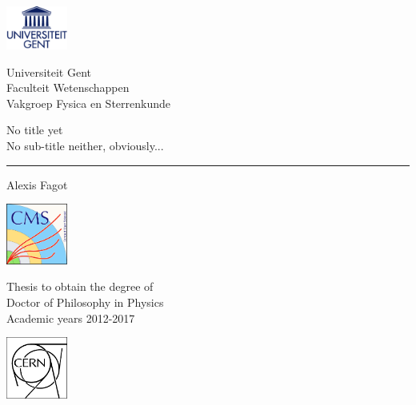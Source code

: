 \documentclass[10pt,a4paper,twoside,dutch,english]{book}                %
\begin{document}
\latintext
\graphicspath{{fig/}}

% 
 \thispagestyle{empty}   %
% 
 \noindent
 \begin{minipage}{3cm}%
   \includegraphics*[width=2cm]{UGentlogo}%
 \end{minipage}\hfill
 \begin{minipage}{8cm}
 \raggedleft
 \textsf{Universiteit Gent\\
 Faculteit Wetenschappen\\
 Vakgroep Fysica en Sterrenkunde}
 \end{minipage}
% 
\bigskip
   \begin{flushleft}
     \Large \textsf{No title yet}\\
     \vspace{0.1in}\large{\textsf{No sub-title neither, obviously...}}%
   \end{flushleft}
 \hrule
% 
 \bigskip
   \LARGE\noindent \textsf{Alexis Fagot} \hfill
 \bigskip
 
 \normalsize
% 
 \vfill
 \begin{minipage}{2.0cm}%
     \includegraphics*[width=2.0cm]{CMS}%
 \end{minipage}\hfill
 \begin{minipage}{6cm}
 \centering
 \textsf{Thesis to obtain the degree of\\
 Doctor of Philosophy in Physics\\
 Academic years 2012-2017}
 \end{minipage}\hfill
 \begin{minipage}{2.0cm}%
     \includegraphics*[width=2.0cm]{CERN}%
 \end{minipage}\hfill
\end{document}
